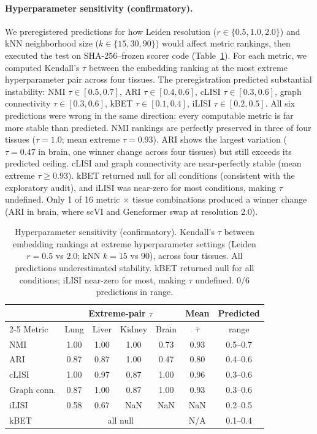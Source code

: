 \documentclass[9pt,lineno]{elife}
\begin{document}
\paragraph{Hyperparameter sensitivity (confirmatory).} We preregistered predictions for how Leiden resolution ($r \in \{0.5, 1.0, 2.0\}$) and kNN neighborhood size ($k \in \{15, 30, 90\}$) would affect metric rankings, then executed the test on SHA-256--frozen scorer code (Table~\ref{tab:hyperparam}). For each metric, we computed Kendall's $\tau$ between the embedding ranking at the most extreme hyperparameter pair across four tissues. The preregistration predicted substantial instability: NMI $\tau \in [0.5, 0.7]$, ARI $\tau \in [0.4, 0.6]$, cLISI $\tau \in [0.3, 0.6]$, graph connectivity $\tau \in [0.3, 0.6]$, kBET $\tau \in [0.1, 0.4]$, iLISI $\tau \in [0.2, 0.5]$. All six predictions were wrong in the same direction: every computable metric is far more stable than predicted. NMI rankings are perfectly preserved in three of four tissues ($\tau = 1.0$; mean extreme $\tau = 0.93$). ARI shows the largest variation ($\tau = 0.47$ in brain, one winner change across four tissues) but still exceeds its predicted ceiling. cLISI and graph connectivity are near-perfectly stable (mean extreme $\tau \geq 0.93$). kBET returned null for all conditions (consistent with the exploratory audit), and iLISI was near-zero for most conditions, making $\tau$ undefined. Only 1 of 16 metric $\times$ tissue combinations produced a winner change (ARI in brain, where scVI and Geneformer swap at resolution 2.0).

\begin{table}[t]
\centering
\caption{Hyperparameter sensitivity (confirmatory). Kendall's $\tau$ between embedding rankings at extreme hyperparameter settings (Leiden $r = 0.5$ vs $2.0$; kNN $k = 15$ vs $90$), across four tissues. All predictions underestimated stability. kBET returned null for all conditions; iLISI near-zero for most, making $\tau$ undefined. 0/6 predictions in range.}
\label{tab:hyperparam}
\small
\begin{tabular}{@{}lcccccc@{}}
\toprule
 & \multicolumn{4}{c}{Extreme-pair $\tau$} & Mean & Predicted \\
\cmidrule(lr){2-5}
Metric & Lung & Liver & Kidney & Brain & $\bar{\tau}$ & range \\
\midrule
NMI & 1.00 & 1.00 & 1.00 & 0.73 & 0.93 & 0.5--0.7 \\
ARI & 0.87 & 0.87 & 1.00 & 0.47 & 0.80 & 0.4--0.6 \\
cLISI & 1.00 & 0.97 & 0.87 & 1.00 & 0.96 & 0.3--0.6 \\
Graph conn. & 0.87 & 1.00 & 0.87 & 1.00 & 0.93 & 0.3--0.6 \\
iLISI & 0.58 & 0.67 & NaN & NaN & NaN & 0.2--0.5 \\
kBET & \multicolumn{4}{c}{all null} & N/A & 0.1--0.4 \\
\bottomrule
\end{tabular}
\end{table}
\end{document}
